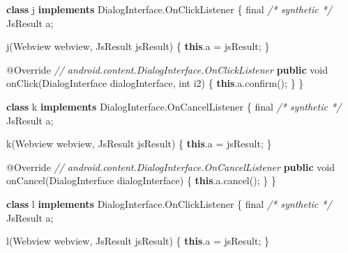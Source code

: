 \documentclass[
]{article}
\newenvironment{Shaded}{}{}
\newcommand{\AttributeTok}[1]{\textcolor[rgb]{0.49,0.56,0.16}{#1}}
\newcommand{\CommentTok}[1]{\textcolor[rgb]{0.38,0.63,0.69}{\textit{#1}}}
\newcommand{\DataTypeTok}[1]{\textcolor[rgb]{0.56,0.13,0.00}{#1}}
\newcommand{\FunctionTok}[1]{\textcolor[rgb]{0.02,0.16,0.49}{#1}}
\newcommand{\KeywordTok}[1]{\textcolor[rgb]{0.00,0.44,0.13}{\textbf{#1}}}
\newcommand{\NormalTok}[1]{#1}
\newcommand{\OperatorTok}[1]{\textcolor[rgb]{0.40,0.40,0.40}{#1}}
\begin{document}
\begin{Shaded}
\begin{Highlighting}[]
    \KeywordTok{class}\NormalTok{ j }\KeywordTok{implements}\NormalTok{ DialogInterface}\OperatorTok{.}\FunctionTok{OnClickListener} \OperatorTok{\{}
        \DataTypeTok{final} \CommentTok{/* synthetic */}\NormalTok{ JsResult a}\OperatorTok{;}

        \FunctionTok{j}\OperatorTok{(}\NormalTok{Webview webview}\OperatorTok{,}\NormalTok{ JsResult jsResult}\OperatorTok{)} \OperatorTok{\{}
            \KeywordTok{this}\OperatorTok{.}\FunctionTok{a} \OperatorTok{=}\NormalTok{ jsResult}\OperatorTok{;}
        \OperatorTok{\}}

        \AttributeTok{@Override} \CommentTok{// android.content.DialogInterface.OnClickListener}
        \KeywordTok{public} \DataTypeTok{void} \FunctionTok{onClick}\OperatorTok{(}\NormalTok{DialogInterface dialogInterface}\OperatorTok{,} \DataTypeTok{int}\NormalTok{ i2}\OperatorTok{)} \OperatorTok{\{}
            \KeywordTok{this}\OperatorTok{.}\FunctionTok{a}\OperatorTok{.}\FunctionTok{confirm}\OperatorTok{();}
        \OperatorTok{\}}
    \OperatorTok{\}}

    \KeywordTok{class}\NormalTok{ k }\KeywordTok{implements}\NormalTok{ DialogInterface}\OperatorTok{.}\FunctionTok{OnCancelListener} \OperatorTok{\{}
        \DataTypeTok{final} \CommentTok{/* synthetic */}\NormalTok{ JsResult a}\OperatorTok{;}

        \FunctionTok{k}\OperatorTok{(}\NormalTok{Webview webview}\OperatorTok{,}\NormalTok{ JsResult jsResult}\OperatorTok{)} \OperatorTok{\{}
            \KeywordTok{this}\OperatorTok{.}\FunctionTok{a} \OperatorTok{=}\NormalTok{ jsResult}\OperatorTok{;}
        \OperatorTok{\}}

        \AttributeTok{@Override} \CommentTok{// android.content.DialogInterface.OnCancelListener}
        \KeywordTok{public} \DataTypeTok{void} \FunctionTok{onCancel}\OperatorTok{(}\NormalTok{DialogInterface dialogInterface}\OperatorTok{)} \OperatorTok{\{}
            \KeywordTok{this}\OperatorTok{.}\FunctionTok{a}\OperatorTok{.}\FunctionTok{cancel}\OperatorTok{();}
        \OperatorTok{\}}
    \OperatorTok{\}}

    \KeywordTok{class}\NormalTok{ l }\KeywordTok{implements}\NormalTok{ DialogInterface}\OperatorTok{.}\FunctionTok{OnClickListener} \OperatorTok{\{}
        \DataTypeTok{final} \CommentTok{/* synthetic */}\NormalTok{ JsResult a}\OperatorTok{;}

        \FunctionTok{l}\OperatorTok{(}\NormalTok{Webview webview}\OperatorTok{,}\NormalTok{ JsResult jsResult}\OperatorTok{)} \OperatorTok{\{}
            \KeywordTok{this}\OperatorTok{.}\FunctionTok{a} \OperatorTok{=}\NormalTok{ jsResult}\OperatorTok{;}
        \OperatorTok{\}}


\end{Highlighting}
\end{Shaded}
\end{document}
